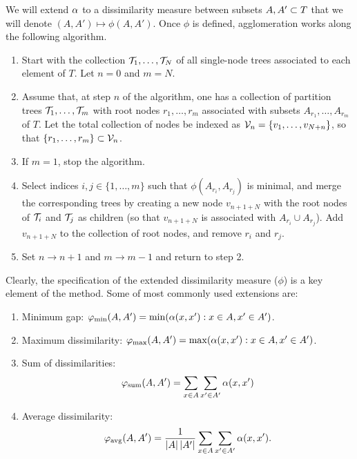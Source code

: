 We will extend $\alpha$ to a dissimilarity measure between subsets $A, A'\subset T$ that we will denote  $(A, A') \mapsto \phi(A, A')$. Once $\phi$ is defined, agglomeration works along the following  algorithm.
\begin{algorithm}
\label{alg:hierarchical.bup}
\begin{enumerate}[label=\arabic*., wide=0.5cm]
\item Start with the collection ${\mathcal T}_1, \ldots, {\mathcal T}_N$ of all single-node trees associated to each element of $T$. Let $n=0$ and $m=N$.
\item Assume that, at  step $n$ of the algorithm, one has a collection of partition trees ${\mathcal T}_1, \ldots, {\mathcal T}_m$ with root nodes $r_1, \ldots, r_{m}$ associated with subsets $A_{r_1}, \ldots, A_{r_m}$ of $T$. Let the total collection of nodes be indexed as ${\mathcal V}_n = \{v_1, \ldots, v_{N+n}\}$, so that $\{r_1, \ldots, r_m\} \subset {\mathcal V}_n$.
\item If $m=1$, stop the algorithm. 
\item Select indices $i,j\in \{1, \ldots, m\}$ such that $\phi(A_{r_i}, A_{r_j})$ is minimal, and merge the corresponding trees by creating a new node $v_{n+1+N}$ with the root nodes of ${\mathcal T}_i$  and ${\mathcal T}_j$ as children (so that $v_{n+1+N}$ is associated with $A_{r_i}\cup A_{r_j}$). Add $v_{n+1+N}$ to the collection of root nodes, and remove $r_i$ and $r_j$.
\item Set $n\to n+1$ and $m\to m-1$ and return to step 2.
\end{enumerate}
\end{algorithm}

Clearly,  the specification of the extended dissimilarity measure ($\phi$) is a key element of the method.
Some of  most commonly used extensions are:
\begin{enumerate}[label=$\bullet$,wide=0.5cm]
\item Minimum gap: $\varphi_{\min}(A, A') = \min(\alpha(x,x'): x\in A, x'\in A')$.
\item Maximum dissimilarity: $\varphi_{\max}(A, A') = \max(\alpha(x,x'): x\in A, x'\in A')$.
\item Sum of dissimilarities: \[
\varphi_{\text{sum}}(A,A') =  \sum_{x\in A} \sum_{x'\in A'} \alpha(x,x')
\]
\item Average dissimilarity: \[
\varphi_{\text{avg}}(A,A') = \frac{1}{|A|\,|A'|} \sum_{x\in A} \sum_{x'\in A'} \alpha(x,x').
\]
\end{enumerate}

